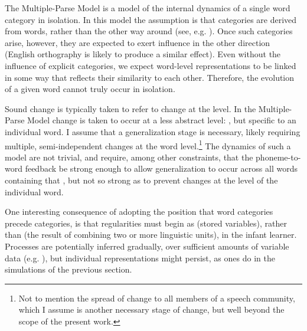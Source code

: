 The Multiple-Parse Model is a model of the internal dynamics of a
single word category in isolation. In this model the assumption is
that  categories are derived from words, rather than the
other way around (see, e.g. \citealp{beckman2000ontogeny}). Once
such categories arise, however, they are expected to exert influence
in the other direction (English orthography is likely to produce a
similar effect). Even without the influence of explicit  categories,
we expect word-level representations to be linked in some way that
reflects their similarity to each other. Therefore, the evolution of a given
word cannot truly occur in isolation. 

Sound change is typically taken to refer to change at the  level.
In the Multiple-Parse Model change is taken to occur at a less abstract
level: , but specific to an individual word. I assume that
a generalization stage is necessary, likely requiring multiple, semi-independent
changes at the word level.\footnote{Not to mention the spread of change to all members of a speech community, which I assume is another necessary stage of change, but well beyond the scope of the present work.} The dynamics of such a model are not trivial, and require, among
other constraints, that the phoneme-to-word feedback  be strong
enough to allow generalization to occur across all words containing
that , but not so strong as to prevent changes at the level
of the individual word. 

One interesting consequence of adopting the position that word categories
precede  categories, is that  regularities must begin
as  (stored  variables), rather than 
(the result of combining two or more linguistic units), in the infant
learner. Processes are potentially inferred gradually, over sufficient
amounts of variable data (e.g. \citealp{goodman1997inseparability}),
but individual  representations might persist, as 
ones do in the simulations of the previous section. 

